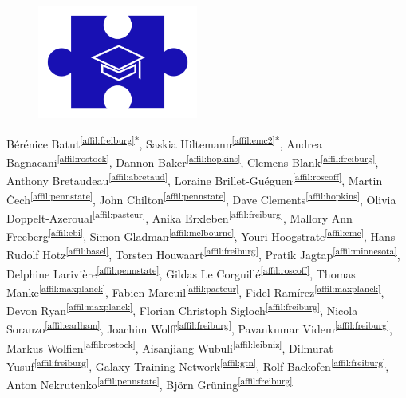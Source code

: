 \setcounter{NAT@ctr}{-1}

\chapter*{}

\begin{figure}[t!]
\centering
\includegraphics[height=10em]{frontmatter/images/chapter-header-training.png}
\end{figure}
\vspace{-4cm}

Bérénice Batut\textsuperscript{\ref{affil:freiburg}*},
Saskia Hiltemann\textsuperscript{\ref{affil:emc2}*},
Andrea Bagnacani\textsuperscript{\ref{affil:rostock}},
Dannon Baker\textsuperscript{\ref{affil:hopkins}},
Clemens Blank\textsuperscript{\ref{affil:freiburg}},
Anthony Bretaudeau\textsuperscript{\ref{affil:abretaud}},
Loraine Brillet-Guéguen\textsuperscript{\ref{affil:roscoff}},
Martin Čech\textsuperscript{\ref{affil:pennstate}},
John Chilton\textsuperscript{\ref{affil:pennstate}},
Dave Clements\textsuperscript{\ref{affil:hopkins}},
Olivia Doppelt-Azeroual\textsuperscript{\ref{affil:pasteur}},
Anika Erxleben\textsuperscript{\ref{affil:freiburg}},
Mallory Ann Freeberg\textsuperscript{\ref{affil:ebi}},
Simon Gladman\textsuperscript{\ref{affil:melbourne}},
Youri Hoogstrate\textsuperscript{\ref{affil:emc}},
Hans-Rudolf Hotz\textsuperscript{\ref{affil:basel}},
Torsten Houwaart\textsuperscript{\ref{affil:freiburg}},
Pratik Jagtap\textsuperscript{\ref{affil:minnesota}},
Delphine Larivière\textsuperscript{\ref{affil:pennstate}},
Gildas Le Corguillé\textsuperscript{\ref{affil:roscoff}},
Thomas Manke\textsuperscript{\ref{affil:maxplanck}},
Fabien Mareuil\textsuperscript{\ref{affil:pasteur}},
Fidel Ramírez\textsuperscript{\ref{affil:maxplanck}},
Devon Ryan\textsuperscript{\ref{affil:maxplanck}},
Florian Christoph Sigloch\textsuperscript{\ref{affil:freiburg}},
Nicola Soranzo\textsuperscript{\ref{affil:earlham}},
Joachim Wolff\textsuperscript{\ref{affil:freiburg}},
Pavankumar Videm\textsuperscript{\ref{affil:freiburg}},
Markus Wolfien\textsuperscript{\ref{affil:rostock}},
Aisanjiang Wubuli\textsuperscript{\ref{affil:leibniz}},
Dilmurat Yusuf\textsuperscript{\ref{affil:freiburg}},
Galaxy Training Network\textsuperscript{\ref{affil:gtn}},
Rolf Backofen\textsuperscript{\ref{affil:freiburg}},
Anton Nekrutenko\textsuperscript{\ref{affil:pennstate}},
Björn Grüning\textsuperscript{\ref{affil:freiburg}}

